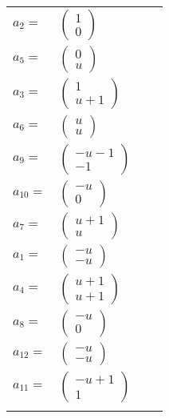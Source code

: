 \documentclass[1p]{elsarticle_modified}
\theoremstyle{definition}
\begin{document}
\begin{tabular}{m{7pt} m{180pt} m{7pt} m{180pt} }
\flushright $a_{2}=$&$\begin{pmatrix}1\\0\end{pmatrix}$ \\
\flushright $a_{5}=$&$\begin{pmatrix}0\\u\end{pmatrix}$ \\
\flushright $a_{3}=$&$\begin{pmatrix}1\\u+1\end{pmatrix}$ \\
\flushright $a_{6}=$&$\begin{pmatrix}u\\u\end{pmatrix}$ \\
\flushright $a_{9}=$&$\begin{pmatrix}- u-1\\-1\end{pmatrix}$ \\
\flushright $a_{10}=$&$\begin{pmatrix}- u\\0\end{pmatrix}$ \\
\flushright $a_{7}=$&$\begin{pmatrix}u+1\\u\end{pmatrix}$ \\
\flushright $a_{1}=$&$\begin{pmatrix}- u\\- u\end{pmatrix}$ \\
\flushright $a_{4}=$&$\begin{pmatrix}u+1\\u+1\end{pmatrix}$ \\
\flushright $a_{8}=$&$\begin{pmatrix}- u\\0\end{pmatrix}$ \\
\flushright $a_{12}=$&$\begin{pmatrix}- u\\- u\end{pmatrix}$ \\
\flushright $a_{11}=$&$\begin{pmatrix}- u+1\\1\end{pmatrix}$\\&\end{tabular}
\end{document}

